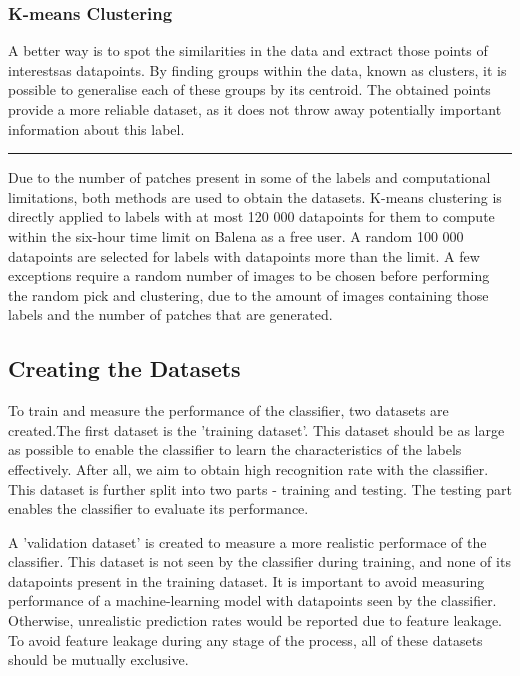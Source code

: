 \documentclass[dissertation.tex]{subfiles}
\begin{document}
\subsubsection{K-means Clustering} \label{sec:method_k-means}
A better way is to spot the similarities in the data and extract those points of interestsas datapoints. By finding groups within the data, known as clusters, it is possible to generalise each of these groups by its centroid. The obtained points provide a more reliable dataset, as it does not throw away potentially important information about this label.


\rule{200pt}{1pt}

Due to the number of patches present in some of the labels and computational limitations, both methods are used to obtain the datasets. K-means clustering is directly applied to labels with at most 120 000 datapoints for them to compute within the six-hour time limit on Balena as a free user. A random 100 000 datapoints are selected for labels with datapoints more than the limit. A few exceptions require a random number of images to be chosen before performing the random pick and clustering, due to the amount of images containing those labels and the number of patches that are generated. 

\subsection{Creating the Datasets}
To train and measure the performance of the classifier, two datasets are created.The first dataset is the 'training dataset'. This dataset should be as large as possible to enable the classifier to learn the characteristics of the labels effectively. After all, we aim to obtain high recognition rate with the classifier. This dataset is further split into two parts - training and testing. The testing part enables the classifier to evaluate its performance.

A 'validation dataset' is created to measure a more realistic performace of the classifier. This dataset is not seen by the classifier during training, and none of its datapoints present in the training dataset. It is important to avoid measuring performance of a machine-learning model with datapoints seen by the classifier. Otherwise, unrealistic prediction rates would be reported due to feature leakage. To avoid feature leakage during any stage of the process, all of these datasets should be mutually exclusive.
\end{document}
